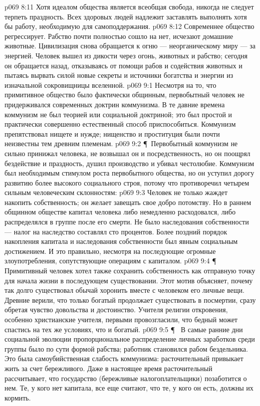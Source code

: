 \vs p069 8:11 Хотя идеалом общества является всеобщая свобода, никогда не следует терпеть праздность. Всех здоровых людей надлежит заставлять выполнять хотя бы работу, необходимую для самоподдержания.
\vs p069 8:12 Современнее общество регрессирует. Рабство почти полностью сошло на нет, исчезают домашние животные. Цивилизация снова обращается к огню --- неорганическому миру --- за энергией. Человек вышел из дикости через огонь, животных и рабство; сегодня он обращается назад, отказываясь от помощи рабов и содействия животных и пытаясь вырвать силой новые секреты и источники богатства и энергии из изначальной сокровищницы вселенной.
\vs p069 9:1 Несмотря на то, что примитивное общество было фактически общинным, первобытный человек не придерживался современных доктрин коммунизма. В те давние времена коммунизм не был теорией или социальной доктриной; это был простой и практически совершенно естественный способ приспособиться. Коммунизм препятствовал нищете и нужде; нищенство и проституция были почти неизвестны тем древним племенам.
\vs p069 9:2 \P\ Первобытный коммунизм не сильно принижал человека, не возвышал он и посредственность, но он поощрял бездействие и праздность, душил производство и убивал честолюбие. Коммунизм был необходимым стимулом роста первобытного общества, но он уступил дорогу развитию более высокого социального строя, потому что противоречил четырем сильным человеческим склонностям:
\vs p069 9:3 \bibnobreakspace {} Человек не только жаждет накопить собственность; он желает завещать свое добро потомству. Но в раннем общинном обществе капитал человека либо немедленно расходовался, либо распределялся в группе после его смерти. Не было наследования собственности --- налог на наследство составлял сто процентов. Более поздний порядок накопления капитала и наследования собственности был явным социальным достижением. И это правильно, несмотря на последующие огромные злоупотребления, сопутствующие операциям с капиталом.
\vs p069 9:4 \P\ \bibnobreakspace {} Примитивный человек хотел также сохранить собственность как отправную точку для начала жизни в последующем существовании. Этот мотив объясняет, почему так долго существовал обычай хоронить вместе с человеком его личные вещи. Древние верили, что только богатый продолжает существовать в посмертии, сразу обретая чувство довольства и достоинство. Учителя религии откровения, особенно христианские учителя, первыми провозгласили, что бедный может спастись на тех же условиях, что и богатый.
\vs p069 9:5 \P\ \bibnobreakspace {} В самые ранние дни социальной эволюции пропорциональное распределение личных заработков среди группы было по сути формой рабства; работник становился рабом бездельника. Это была самоубийственная слабость коммунизма: расточительный привыкает жить за счет бережливого. Даже в настоящее время расточительный рассчитывает, что государство (бережливые налогоплательщики) позаботится о нем. Те, у кого нет капитала, все еще считают, что те, у кого он есть, должны их кормить.
